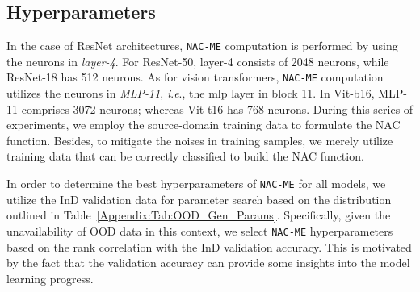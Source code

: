 \documentclass{article} \usepackage{iclr2024_conference,times}
\newcommand{\ie}{\textit{i}.\textit{e}.}
\begin{document}
\subsection{Hyperparameters}
In the case of ResNet architectures, \texttt{NAC-ME} computation is performed by using the neurons in \textit{layer-4}. For ResNet-50, layer-4 consists of 2048 neurons, while ResNet-18 has 512 neurons.
As for vision transformers, \texttt{NAC-ME} computation utilizes the neurons in \textit{MLP-11}, \ie, the mlp layer in block 11. 
In Vit-b16, MLP-11 comprises 3072 neurons; whereas Vit-t16 has 768 neurons. 
During this series of experiments, we employ the source-domain training data to formulate the NAC function.
Besides, to mitigate the noises in training samples, we merely utilize training data that can be correctly classified to build the NAC function.


In order to determine the best hyperparameters of \texttt{NAC-ME} for all models, we utilize the InD validation data for parameter search based on the distribution outlined in Table~\ref{Appendix:Tab:OOD_Gen_Params}. 
Specifically, given the unavailability of OOD data in this context, we select \texttt{NAC-ME} hyperparameters  based on the rank correlation with the InD validation accuracy. This is motivated by the fact that the validation accuracy can provide some insights into the model learning progress.














\vspace{5mm}
\begin{table*}[!hb]
	\centering
	\caption{Hyperparameters of our \texttt{NAC-ME} and their distributions for random search. Note that $r$ can be computed based on $O^*$, as illustrated in Appendix~\ref{Sec:Appendix:Approx}}
	\label{Appendix:Tab:OOD_Gen_Params}
\end{table*}
\end{document}
